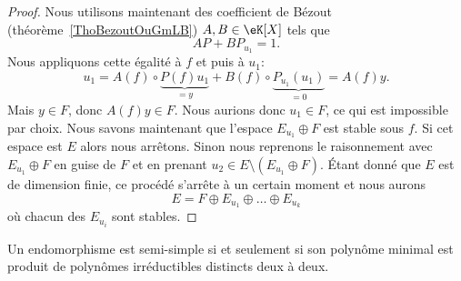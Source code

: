 \begin{proof}
    Nous utilisons maintenant des coefficient de Bézout (théorème~\ref{ThoBezoutOuGmLB}) \( A,B\in \eK[X]\) tels que
    \begin{equation}
        AP+BP_{u_1}=1.
    \end{equation}
    Nous appliquons cette égalité à \( f\) et puis à \( u_1\):
    \begin{equation}
        u_1=A(f)\circ \underbrace{P(f)u_1}_{=y}+B(f)\circ \underbrace{P_{u_1}(u_1)}_{=0}=A(f)y.
    \end{equation}
    Mais \( y\in F\), donc \( A(f)y\in F\). Nous aurions donc \( u_1\in F\), ce qui est impossible par choix. Nous savons maintenant que l'espace \( E_{u_1}\oplus F\) est stable sous \( f\). Si cet espace est \( E\) alors nous arrêtons. Sinon nous reprenons le raisonnement avec \( E_{u_1}\oplus F\) en guise de \( F\) et en prenant \( u_2\in E\setminus(E_{u_1}\oplus F)\). Étant donné que \( E\) est de dimension finie, ce procédé s'arrête à un certain moment et nous aurons
    \begin{equation}
        E=F\oplus E_{u_1}\oplus\ldots\oplus E_{u_k}
    \end{equation}
    où chacun des \( E_{u_i}\) sont stables.
\end{proof}

\begin{theorem} \label{ThoFgsxCE}
    Un endomorphisme est semi-simple si et seulement si son polynôme minimal est produit de polynômes irréductibles distincts deux à deux.
\end{theorem}

